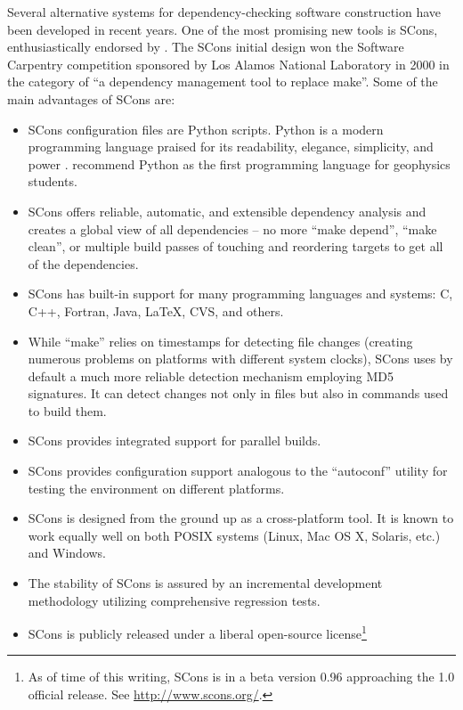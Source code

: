 Several alternative systems for dependency-checking software
construction have been developed in recent years. One of the most
promising new tools is SCons, enthusiastically endorsed by
\cite{dubois}. The SCons initial design won the Software Carpentry
competition sponsored by Los Alamos National Laboratory in 2000 in the
category of ``a dependency management tool to replace make''.  Some of
the main advantages of SCons are:
\begin{itemize}
\item SCons configuration files are Python scripts. Python is a modern
  programming language praised for its readability, elegance,
  simplicity, and power \cite[]{python1,python2}.
  \cite{TLE21-03-02600267} recommend Python as the first programming
  language for geophysics students.
\item SCons offers reliable, automatic, and extensible dependency
  analysis and creates a global view of all dependencies -- no more
  ``make depend'', ``make clean'', or multiple build passes of
  touching and reordering targets to get all of the dependencies.
\item SCons has built-in support for many programming languages and
  systems: C, C++, Fortran, Java, LaTeX, CVS, and others.
\item While ``make'' relies on timestamps for detecting file changes
  (creating numerous problems on platforms with different system
  clocks), SCons uses by default a much more reliable detection
  mechanism employing MD5 signatures. It can detect changes not only
  in files but also in commands used to build them.
\item SCons provides integrated support for parallel builds.
\item SCons provides configuration support analogous to the ``autoconf''
  utility for testing the environment on different platforms.
\item SCons is designed from the ground up as a cross-platform tool.
  It is known to work equally well on both POSIX systems (Linux, Mac
  OS X, Solaris, etc.) and Windows.
\item The stability of SCons is assured by an incremental development
  methodology utilizing comprehensive regression tests.
\item SCons is publicly released under a liberal open-source license\footnote{As of
    time of this writing, SCons is in a beta version 0.96 approaching
    the 1.0 official release. See \url{http://www.scons.org/}.}
\end{itemize}

